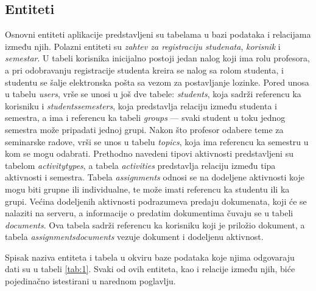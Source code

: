 \documentclass[12pt,oneside]{memoir}
\begin{document}
\subsection{Entiteti}
\par Osnovni entiteti aplikacije predstavljeni su tabelama u bazi podataka i relacijama između njih.  Polazni entiteti su \emph{zahtev za registraciju studenata}, \emph{korisnik} i \emph{semestar}. U tabeli korisnika inicijalno postoji jedan nalog koji ima rolu profesora, a pri odobravanju registracije studenta kreira se nalog sa rolom studenta, i studentu se šalje elektronska pošta sa vezom za postavljanje lozinke. Pored unosa u tabelu \textit{users}, vrše se unosi u još dve tabele: \emph{students}, koja sadrži referencu ka korisniku i \emph{students{\textunderscore}semesters}, koja predstavlja relaciju između studenta i semestra, a ima i referencu ka tabeli \emph{groups} --- svaki student u toku jednog semestra može pripadati jednoj grupi. Nakon što profesor odabere teme za seminarske radove, vrši se unos u tabelu \emph{topics}, koja ima referencu ka semestru u kom se mogu odabrati. Prethodno navedeni tipovi aktivnosti predstavljeni su tabelom \emph{activity{\textunderscore}types}, a tabela \emph{activities} predstavlja relaciju između tipa aktivnosti i semestra. Tabela \emph{assignments} odnosi se na dodeljene aktivnosti koje mogu biti grupne ili individualne, te može imati referencu ka studentu ili ka grupi. Većina dodeljenih aktivnosti podrazumeva predaju dokumenata, koji će se nalaziti na serveru, a informacije o predatim dokumentima čuvaju se u tabeli \emph{documents}. Ova tabela sadrži referencu ka korisniku koji je priložio dokument, a tabela \emph{assignments{\textunderscore}documents} vezuje dokument i dodeljenu aktivnost.
\par Spisak naziva entiteta i tabela u okviru baze podataka koje njima odgovaraju dati su u tabeli \ref{tab:1}. Svaki od ovih entiteta, kao i relacije između njih, biće pojedinačno istestirani u narednom poglavlju.
\end{document}
